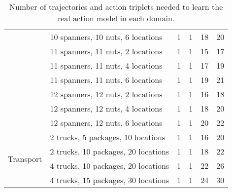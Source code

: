 \documentclass{article}
\begin{document}
\begin{table}[bt!]
{\begin{tabular}{ll|cc|cc}
                                & 10 spanners, 10 nuts, 6 locations & 1                       & 1                        & 18                      & 20                       \\
                                & 11 spanners, 11 nuts, 2 locations & 1                       & 1                        & 15                      & 17                       \\
                                & 11 spanners, 11 nuts, 4 locations & 1                       & 1                        & 17                      & 19                       \\
                                & 11 spanners, 11 nuts, 6 locations & 1                       & 1                        & 19                      & 21                       \\
                                & 12 spanners, 12 nuts, 2 locations & 1                       & 1                        & 16                      & 18                       \\
                                & 12 spanners, 12 nuts, 4 locations & 1                       & 1                        & 18                      & 20                       \\
                                & 12 spanners, 12 nuts, 6 locations & 1                       & 1                        & 20                      & 22                       \\ \midrule\multirow{4}{*}{Transport}& 2 trucks, 5 packages, 10 locations                      & 1                       & 1                        & 16                       & 20                        \\
                                & 2 trucks, 10 packages, 20 locations                     & 1                       & 1                        & 18                       & 22                        \\
                                & 4 trucks, 10 packages, 20 locations                      & 1                       & 1                        & 22                       & 26                        \\
                                & 4 trucks, 15 packages, 30 locations                    & 1                       & 1                        & 24                       & 30                       \\ \bottomrule
\end{tabular}
}
\caption{Number of trajectories and action triplets needed to learn the real action model in each domain.} 
\label{tab:all_experiments}
\end{table}
\end{document}
